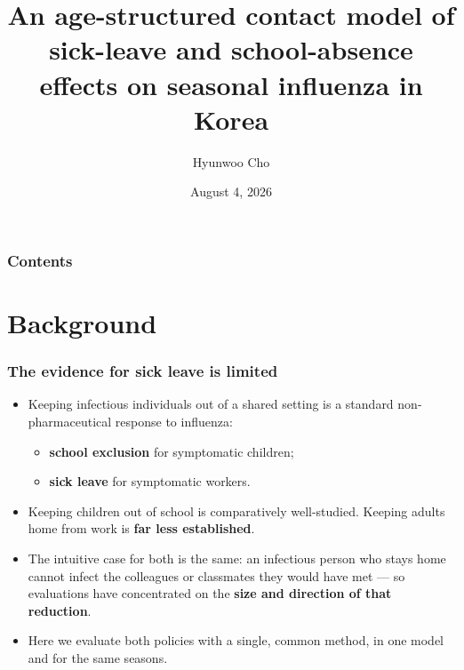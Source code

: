 \documentclass[dvipsnames, 10pt]{beamer}
\author{Hyunwoo Cho}
\institute{National Institute for Mathematical Sciences}
\date{August 4, 2026}
\title{An age-structured contact model of sick-leave and school-absence effects on seasonal influenza in Korea}
\begin{document}
\maketitle

\begin{frame}\frametitle{Contents}
    \tableofcontents[subsectionstyle=hide]
\end{frame}

\section{Background}

\begin{frame}\frametitle{The evidence for sick leave is limited}
    \begin{itemize}
        \item Keeping infectious individuals out of a shared setting is a standard
              non-pharmaceutical response to influenza:
              \begin{itemize}
                  \item \textbf{school exclusion} for symptomatic children;
                  \item \textbf{sick leave} for symptomatic workers.
              \end{itemize}
        \item Keeping children out of school is comparatively well-studied.
              Keeping adults home from work is \textbf{far less established}.
        \item The intuitive case for both is the same: an infectious person who
              stays home cannot infect the colleagues or classmates they would
              have met --- so evaluations have concentrated on the \textbf{size and
              direction of that reduction}.
        \item Here we evaluate both policies with a single, common method, in one
              model and for the same seasons.
    \end{itemize}
\end{frame}
\end{document}
